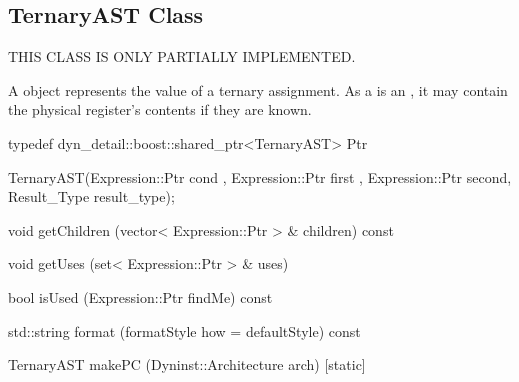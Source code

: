 \subsection{TernaryAST Class}
\label{sec:TernaryAST}

THIS CLASS IS ONLY PARTIALLY IMPLEMENTED.


A  object represents the value of a ternary assignment. As a 
is an , it may contain the physical register's contents if they
are known.

\begin{apient}
  typedef dyn\_detail::boost::shared\_ptr<TernaryAST> Ptr
\end{apient}

\begin{apient}
  TernaryAST(Expression::Ptr cond , Expression::Ptr first , Expression::Ptr second, Result_Type result_type);
\end{apient}

\begin{apient}
  void getChildren (vector< Expression::Ptr > & children) const
\end{apient}

\begin{apient}
  void getUses (set< Expression::Ptr > & uses)
\end{apient}

\begin{apient}
  bool isUsed (Expression::Ptr findMe) const
\end{apient}

\begin{apient}
  std::string format (formatStyle how = defaultStyle) const
\end{apient}

\begin{apient}
  TernaryAST makePC (Dyninst::Architecture arch) [static]
\end{apient}

